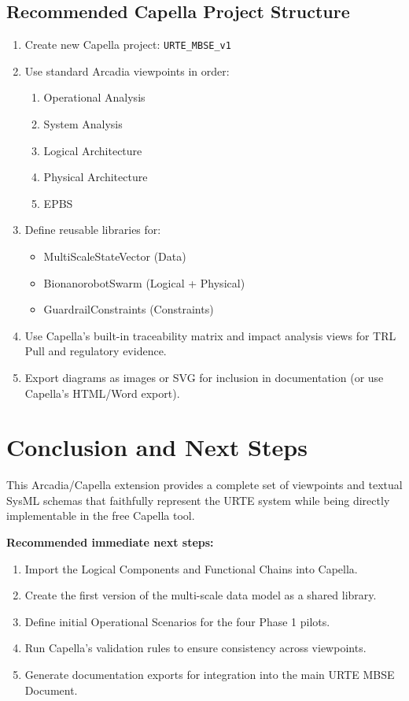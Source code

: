 \documentclass[11pt,a4paper]{report}
\begin{document}
\section{Recommended Capella Project Structure}

\begin{enumerate}
    \item Create new Capella project: \texttt{URTE\_MBSE\_v1}
    \item Use standard Arcadia viewpoints in order:
          \begin{enumerate}
              \item Operational Analysis
              \item System Analysis
              \item Logical Architecture
              \item Physical Architecture
              \item EPBS
          \end{enumerate}
    \item Define reusable libraries for:
          \begin{itemize}
              \item MultiScaleStateVector (Data)
              \item BionanorobotSwarm (Logical + Physical)
              \item GuardrailConstraints (Constraints)
          \end{itemize}
    \item Use Capella’s built-in traceability matrix and impact analysis views for TRL Pull and regulatory evidence.
    \item Export diagrams as images or SVG for inclusion in documentation (or use Capella’s HTML/Word export).
\end{enumerate}

\chapter{Conclusion and Next Steps}

This Arcadia/Capella extension provides a complete set of viewpoints and textual SysML schemas that faithfully represent the URTE system while being directly implementable in the free Capella tool.

\textbf{Recommended immediate next steps:}
\begin{enumerate}
    \item Import the Logical Components and Functional Chains into Capella.
    \item Create the first version of the multi-scale data model as a shared library.
    \item Define initial Operational Scenarios for the four Phase 1 pilots.
    \item Run Capella’s validation rules to ensure consistency across viewpoints.
    \item Generate documentation exports for integration into the main URTE MBSE Document.
\end{enumerate}
\end{document}
